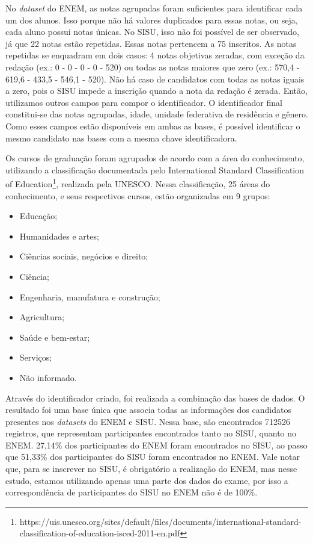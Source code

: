 No \textit{dataset} do ENEM, as notas agrupadas foram suficientes para identificar cada um dos alunos. Isso porque não há valores duplicados para essas notas, ou seja, cada aluno possui notas únicas. No SISU, isso não foi possível de ser observado, já que 22 notas estão repetidas. Essas notas pertencem a 75 inscritos. As notas repetidas se enquadram em dois casos: 4 notas objetivas zeradas, com exceção da redação (ex.: 0 - 0 - 0 - 0 - 520) ou todas as notas maiores que zero (ex.: 570,4 - 619,6 - 433,5 - 546,1 - 520). Não há caso de candidatos com todas as notas iguais a zero, pois o SISU impede a inscrição quando a nota da redação é zerada. Então, utilizamos outros campos para compor o identificador. O identificador final constitui-se das notas agrupadas, idade, unidade federativa de residência e gênero. Como esses campos estão disponíveis em ambas as bases, é possível identificar o mesmo candidato nas bases com a mesma chave identificadora.

Os cursos de graduação foram agrupados de acordo com a área do conhecimento, utilizando a classificação documentada pelo International Standard Classification of Education\footnote{https://uis.unesco.org/sites/default/files/documents/international-standard-classification-of-education-isced-2011-en.pdf}, realizada pela UNESCO. Nessa classificação, 25 áreas do conhecimento, e seus respectivos cursos, estão organizadas em 9 grupos: 

\begin{itemize}
  \item Educação;
  \item Humanidades e artes;
  \item Ciências sociais, negócios e direito;
  \item Ciência;
  \item Engenharia, manufatura e construção;
  \item Agricultura;
  \item Saúde e bem-estar;
  \item Serviços;
  \item Não informado.
\end{itemize}

Através do identificador criado, foi realizada a combinação das bases de dados. O resultado foi uma base única que associa todas as informações dos candidatos presentes nos \textit{datasets} do ENEM e SISU. Nessa base, são encontrados 712526 registros, que representam participantes encontrados tanto no SISU, quanto no ENEM. 27,14\% dos participantes do ENEM foram encontrados no SISU, ao passo que 51,33\% dos participantes do SISU foram encontrados no ENEM. Vale notar que, para se inscrever no SISU, é obrigatório a realização do ENEM, mas nesse estudo, estamos utilizando apenas uma parte dos dados do exame, por isso a correspondência de participantes do SISU no ENEM não é de 100\%.

